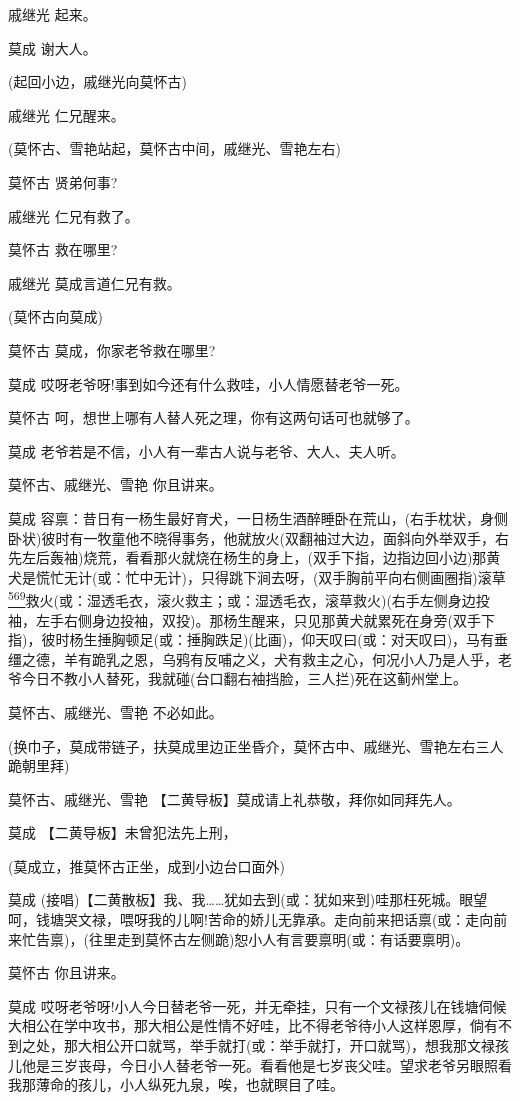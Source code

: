 戚继光 起来。

莫成 谢大人。

(起回小边，戚继光向莫怀古)

戚继光 仁兄醒来。

(莫怀古、雪艳站起，莫怀古中间，戚继光、雪艳左右)

莫怀古 贤弟何事?

戚继光 仁兄有救了。

莫怀古 救在哪里?

戚继光 莫成言道仁兄有救。

(莫怀古向莫成)

莫怀古 莫成，你家老爷救在哪里?

莫成 哎呀老爷呀!事到如今还有什么救哇，小人情愿替老爷一死。

莫怀古 呵，想世上哪有人替人死之理，你有这两句话可也就够了。

莫成 老爷若是不信，小人有一辈古人说与老爷、大人、夫人听。

莫怀古、戚继光、雪艳 你且讲来。

莫成
容禀：昔日有一杨生最好育犬，一日杨生酒醉睡卧在荒山，(右手枕状，身侧卧状)彼时有一牧童他不晓得事务，他就放火(双翻袖过大边，面斜向外举双手，右先左后轰袖)烧荒，看看那火就烧在杨生的身上，(双手下指，边指边回小边)那黄犬是慌忙无计(或：忙中无计)，只得跳下涧去呀，(双手胸前平向右侧画圈指)滚草\protect\hyperlink{fn569}{\textsuperscript{569}}救火(或：湿透毛衣，滚火救主；或：湿透毛衣，滚草救火)(右手左侧身边投袖，左手右侧身边投袖，双投)。那杨生醒来，只见那黄犬就累死在身旁(双手下指)，彼时杨生捶胸顿足(或：捶胸跌足)(比画)，仰天叹曰(或：对天叹曰)，马有垂缰之德，羊有跪乳之恩，乌鸦有反哺之义，犬有救主之心，何况小人乃是人乎，老爷今日不教小人替死，我就碰(台口翻右袖挡脸，三人拦)死在这蓟州堂上。

莫怀古、戚继光、雪艳 不必如此。

(换巾子，莫成带链子，扶莫成里边正坐昏介，莫怀古中、戚继光、雪艳左右三人跪朝里拜)

莫怀古、戚继光、雪艳 【二黄导板】莫成请上礼恭敬，拜你如同拜先人。

莫成 【二黄导板】未曾犯法先上刑，

(莫成立，推莫怀古正坐，成到小边台口面外)

莫成
(接唱)【二黄散板】我、我\ldots{}\ldots{}犹如去到(或：犹如来到)哇那枉死城。眼望呵，钱塘哭文禄，喂呀我的儿啊!苦命的娇儿无靠承。走向前来把话禀(或：走向前来忙告禀)，(往里走到莫怀古左侧跪)恕小人有言要禀明(或：有话要禀明)。

莫怀古 你且讲来。

莫成
哎呀老爷呀!小人今日替老爷一死，并无牵挂，只有一个文禄孩儿在钱塘伺候大相公在学中攻书，那大相公是性情不好哇，比不得老爷待小人这样恩厚，倘有不到之处，那大相公开口就骂，举手就打(或：举手就打，开口就骂)，想我那文禄孩儿他是三岁丧母，今日小人替老爷一死。看看他是七岁丧父哇。望求老爷另眼照看我那薄命的孩儿，小人纵死九泉，唉，也就瞑目了哇。

